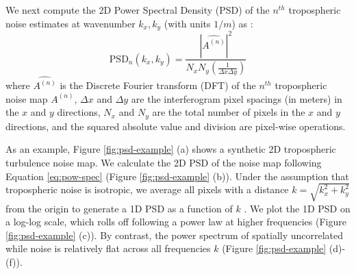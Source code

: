 We next compute the 2D Power Spectral Density (PSD) of the $n^{th}$ tropospheric noise estimates at  wavenumber $ k_x, k_y $ (with units $1/m$) as \cite{Jacobs2017QuantitativeCharacterizationSurface}:
\begin{equation}
	\text{PSD}_n(k_x, k_y) = \frac{| \widehat{A^{(n)}} |^2 }{N_x N_y (\frac{1}{\Delta x \Delta y}) } \label{eq:pow-spec}
\end{equation}
where  $\widehat{A^{(n)}}$ is the Discrete Fourier transform (DFT) of  the $n^{th}$ tropospheric noise map $A^{(n)}$, $\Delta x$ and $\Delta y$ are the interferogram pixel spacings (in meters) in the $x$ and $y$ directions, $N_x$ and $N_y$ are the total number of pixels in the $x$ and $y$ directions, and the squared absolute value and division are pixel-wise operations. 


As an example, Figure \ref{fig:psd-example} (a) shows a synthetic 2D tropospheric turbulence noise map. We calculate the 2D PSD of the noise map following Equation \eqref{eq:pow-spec} (Figure \ref{fig:psd-example} (b)). Under the assumption that tropospheric noise is isotropic, we average all pixels with a distance  $k= \sqrt{k_x^2 + k_y^2}$ from the origin to generate a 1D PSD as a function of $k$ \cite{Hanssen2001RadarInterferometryData}.
We plot the 1D PSD on a log-log scale, which rolls off following a power law at higher frequencies (Figure \ref{fig:psd-example} (c)). By contrast, the power spectrum of spatially uncorrelated while noise is relatively flat across all frequencies $k$ (Figure \ref{fig:psd-example} (d)-(f)).


